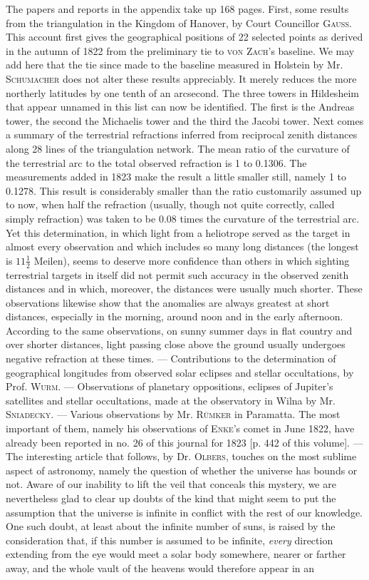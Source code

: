The papers and reports in the appendix take up 168 pages. First, some results from the triangulation in the Kingdom of Hanover, by Court Councillor \textsc{Gauss}. This account first gives the geographical positions of 22 selected points as derived in the autumn of 1822 from the preliminary tie to \textsc{von Zach}'s baseline. We may add here that the tie since made to the baseline measured in Holstein by Mr. \textsc{Schumacher} does not alter these results appreciably. It merely reduces the more northerly latitudes by one tenth of an arcsecond. The three towers in Hildesheim that appear unnamed in this list can now be identified. The first is the Andreas tower, the second the Michaelis tower and the third the Jacobi tower. Next comes a summary of the terrestrial refractions inferred from reciprocal zenith distances along 28 lines of the triangulation network. The mean ratio of the curvature of the terrestrial arc to the total observed refraction is 1 to 0.1306. The measurements added in 1823 make the result a little smaller still, namely 1 to 0.1278. This result is considerably smaller than the ratio customarily assumed up to now, when half the refraction (usually, though not quite correctly, called simply refraction) was taken to be 0.08 times the curvature of the terrestrial arc. Yet this determination, in which light from a heliotrope served as the target in almost every observation and which includes so many long distances (the longest is $11\tfrac{1}{2}$ Meilen), seems to deserve more confidence than others in which sighting terrestrial targets in itself did not permit such accuracy in the observed zenith distances and in which, moreover, the distances were usually much shorter. These observations likewise show that the anomalies are always greatest at short distances, especially in the morning, around noon and in the early afternoon. According to the same observations, on sunny summer days in flat country and over shorter distances, light passing close above the ground usually undergoes negative refraction at these times. --- Contributions to the determination of geographical longitudes from observed solar eclipses and stellar occultations, by Prof. \textsc{Wurm}. --- Observations of planetary oppositions, eclipses of Jupiter's satellites and stellar occultations, made at the observatory in Wilna by Mr. \textsc{Sniadecky}. --- Various observations by Mr. \textsc{Rümker} in Paramatta. The most important of them, namely his observations of \textsc{Enke}'s comet in June 1822, have already been reported in no. 26 of this journal for 1823 [p. 442 of this volume]. --- The interesting article that follows, by Dr. \textsc{Olbers}, touches on the most sublime aspect of astronomy, namely the question of whether the universe has bounds or not. Aware of our inability to lift the veil that conceals this mystery, we are nevertheless glad to clear up doubts of the kind that might seem to put the assumption that the universe is infinite in conflict with the rest of our knowledge. One such doubt, at least about the infinite number of suns, is raised by the consideration that, if this number is assumed to be infinite, \emph{every} direction extending from the eye would meet a solar body somewhere, nearer or farther away, and the whole vault of the heavens would therefore appear in an 